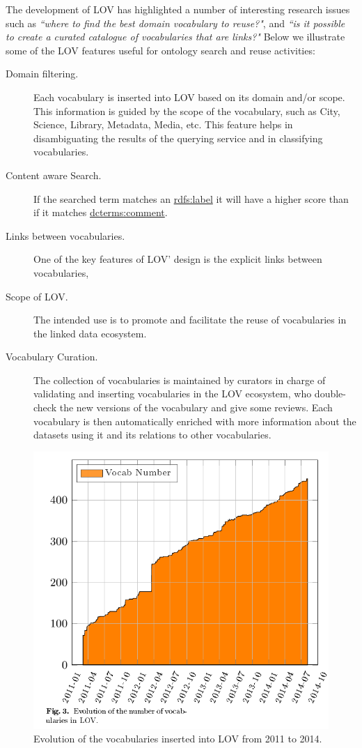 The development of LOV has highlighted a number of interesting research issues such as \textit{``where to find the best domain vocabulary to reuse?"}, and \textit{``is it possible to create a curated catalogue of vocabularies that are links?"}
Below we illustrate some of the LOV features useful for ontology search and reuse activities:

 \begin{description}
	\item [Domain filtering.] Each vocabulary is inserted into LOV based on its domain and/or scope. This information is guided by the scope of the vocabulary, such as City, Science, Library, Metadata, Media, etc. This feature helps in disambiguating the results of the querying service and in classifying vocabularies.
	\item [Content aware Search.] If the searched term matches an \url{rdfs:label} it will have a higher score than if it matches \url{dcterms:comment}.
	\item [Links between vocabularies.] One of the key features of LOV' design is the explicit links between vocabularies,
	 \item [Scope of LOV.]The intended use is to promote and facilitate the reuse of vocabularies in the linked data ecosystem.
	 \item [Vocabulary Curation.]The collection of vocabularies is maintained by curators in charge of validating and inserting vocabularies in the LOV ecosystem, who double-check the new versions of the vocabulary and give some reviews. Each vocabulary is then automatically enriched with more information about the datasets using it and its relations to other vocabularies.
 \end{description}


\begin{figure}[h!tb]
\centering
  \includegraphics[width=\linewidth]{img/LOVEvol.png}
  \caption{Evolution of the vocabularies inserted into LOV from 2011 to 2014.}
  \label{fig:graphEvolution}
\end{figure}

